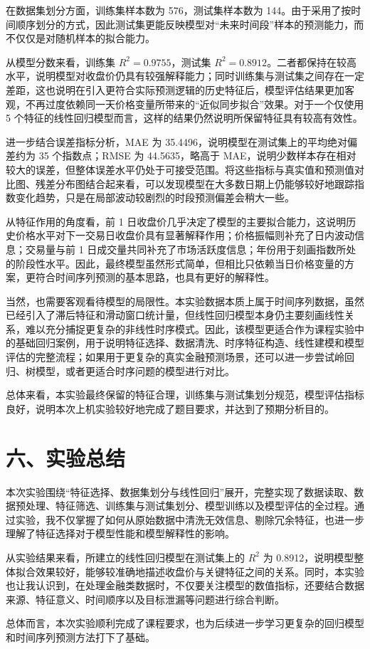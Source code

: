 \documentclass[12pt,a4paper]{ctexart}
\begin{document}
在数据集划分方面，训练集样本数为 576，测试集样本数为 144。由于采用了按时间顺序划分的方式，因此测试集更能反映模型对“未来时间段”样本的预测能力，而不仅仅是对随机样本的拟合能力。

从模型分数来看，训练集 $R^2=0.9755$，测试集 $R^2=0.8912$。二者都保持在较高水平，说明模型对收盘价仍具有较强解释能力；同时训练集与测试集之间存在一定差距，这也说明在引入更符合实际预测逻辑的历史特征后，模型评估结果更加客观，不再过度依赖同一天价格变量所带来的“近似同步拟合”效果。对于一个仅使用 5 个特征的线性回归模型而言，这样的结果仍然说明所保留特征具有较高有效性。

进一步结合误差指标分析，MAE 为 35.4496，说明模型在测试集上的平均绝对偏差约为 35 个指数点；RMSE 为 44.5635，略高于 MAE，说明少数样本存在相对较大的误差，但整体误差水平仍处于可接受范围。将这些指标与真实值和预测值对比图、残差分布图结合起来看，可以发现模型在大多数日期上仍能够较好地跟踪指数变化趋势，只是在局部波动较剧烈的时段预测偏差会稍大一些。

从特征作用的角度看，前 1 日收盘价几乎决定了模型的主要拟合能力，这说明历史价格水平对下一交易日收盘价具有显著解释作用；价格振幅则补充了日内波动信息；交易量与前 1 日成交量共同补充了市场活跃度信息；年份用于刻画指数所处的阶段性水平。因此，最终模型虽然形式简单，但相比只依赖当日价格变量的方案，更符合时间序列预测的基本思路，也具有更好的解释性。

当然，也需要客观看待模型的局限性。本实验数据本质上属于时间序列数据，虽然已经引入了滞后特征和滑动窗口统计量，但线性回归模型本身仍主要刻画线性关系，难以充分捕捉更复杂的非线性时序模式。因此，该模型更适合作为课程实验中的基础回归案例，用于说明特征选择、数据清洗、时序特征构造、线性建模和模型评估的完整流程；如果用于更复杂的真实金融预测场景，还可以进一步尝试岭回归、树模型，或者更适合时序问题的模型进行对比。

总体来看，本实验最终保留的特征合理，训练集与测试集划分规范，模型评估指标良好，说明本次上机实验较好地完成了题目要求，并达到了预期分析目的。

\section*{六、实验总结}
本次实验围绕“特征选择、数据集划分与线性回归”展开，完整实现了数据读取、数据预处理、特征筛选、训练集与测试集划分、模型训练以及模型评估的全过程。通过实验，我不仅掌握了如何从原始数据中清洗无效信息、剔除冗余特征，也进一步理解了特征选择对于模型性能和模型解释性的影响。

从实验结果来看，所建立的线性回归模型在测试集上的 $R^2$ 为 0.8912，说明模型整体拟合效果较好，能够较准确地描述收盘价与关键特征之间的关系。同时，本实验也让我认识到，在处理金融类数据时，不仅要关注模型的数值指标，还要结合数据来源、特征意义、时间顺序以及目标泄漏等问题进行综合判断。

总体而言，本次实验顺利完成了课程要求，也为后续进一步学习更复杂的回归模型和时间序列预测方法打下了基础。
\end{document}
